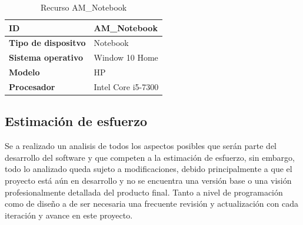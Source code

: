 \begin{table}[H]
    \centering
        \begin{tabular}{|l | p{12cm} |}        
        \hline
        \textbf{ID} & AM\_Notebook \\
        \hline
        \textbf{Tipo de dispositvo} & Notebook \\
        \hline
        \textbf{Sistema operativo} & Window 10 Home \\
        \hline
        \textbf{Modelo} & HP \\
        \hline
        \textbf{Procesador} & Intel Core i5-7300 \\    
        \hline            
        \end{tabular}
    \caption{Recurso AM\_Notebook}
\end{table}

\subsection{Estimación de esfuerzo}
Se a realizado un analisis de todos los aspectos posibles que serán parte del desarrollo del software y que competen a la estimación de esfuerzo, sin embargo, todo lo analizado queda sujeto a modificaciones, debido principalmente a que el proyecto está aún en desarrollo y no se encuentra una versión base o una visión profesionalmente detallada del producto final. Tanto a nivel de programación como de diseño a de ser necesaria una frecuente revisión y actualización con cada iteración y avance en este proyecto.


